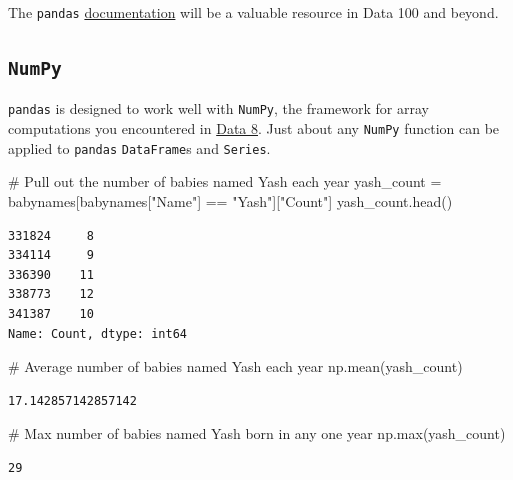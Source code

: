 \documentclass[
  letterpaper,
  DIV=11,
  numbers=noendperiod]{scrreprt}
\newenvironment{Shaded}{\begin{snugshade}}{\end{snugshade}}
\newcommand{\BuiltInTok}[1]{\textcolor[rgb]{0.00,0.23,0.31}{#1}}
\newcommand{\CommentTok}[1]{\textcolor[rgb]{0.37,0.37,0.37}{#1}}
\newcommand{\NormalTok}[1]{\textcolor[rgb]{0.00,0.23,0.31}{#1}}
\newcommand{\OperatorTok}[1]{\textcolor[rgb]{0.37,0.37,0.37}{#1}}
\newcommand{\StringTok}[1]{\textcolor[rgb]{0.13,0.47,0.30}{#1}}
\begin{document}
The \texttt{pandas}
\href{https://pandas.pydata.org/docs/reference/index.html}{documentation}
will be a valuable resource in Data 100 and beyond.

\subsection{\texorpdfstring{\texttt{NumPy}}{NumPy}}\label{numpy}

\texttt{pandas} is designed to work well with \texttt{NumPy}, the
framework for array computations you encountered in
\href{https://www.data8.org/su23/reference/\#array-functions-and-methods}{Data
8}. Just about any \texttt{NumPy} function can be applied to
\texttt{pandas} \texttt{DataFrame}s and \texttt{Series}.

\begin{Shaded}
\begin{Highlighting}[]
\CommentTok{\# Pull out the number of babies named Yash each year}
\NormalTok{yash\_count }\OperatorTok{=}\NormalTok{ babynames[babynames[}\StringTok{"Name"}\NormalTok{] }\OperatorTok{==} \StringTok{"Yash"}\NormalTok{][}\StringTok{"Count"}\NormalTok{]}
\NormalTok{yash\_count.head()}
\end{Highlighting}
\end{Shaded}

\begin{verbatim}
331824     8
334114     9
336390    11
338773    12
341387    10
Name: Count, dtype: int64
\end{verbatim}

\begin{Shaded}
\begin{Highlighting}[]
\CommentTok{\# Average number of babies named Yash each year}
\NormalTok{np.mean(yash\_count)}
\end{Highlighting}
\end{Shaded}

\begin{verbatim}
17.142857142857142
\end{verbatim}

\begin{Shaded}
\begin{Highlighting}[]
\CommentTok{\# Max number of babies named Yash born in any one year}
\NormalTok{np.}\BuiltInTok{max}\NormalTok{(yash\_count)}
\end{Highlighting}
\end{Shaded}

\begin{verbatim}
29
\end{verbatim}
\end{document}
